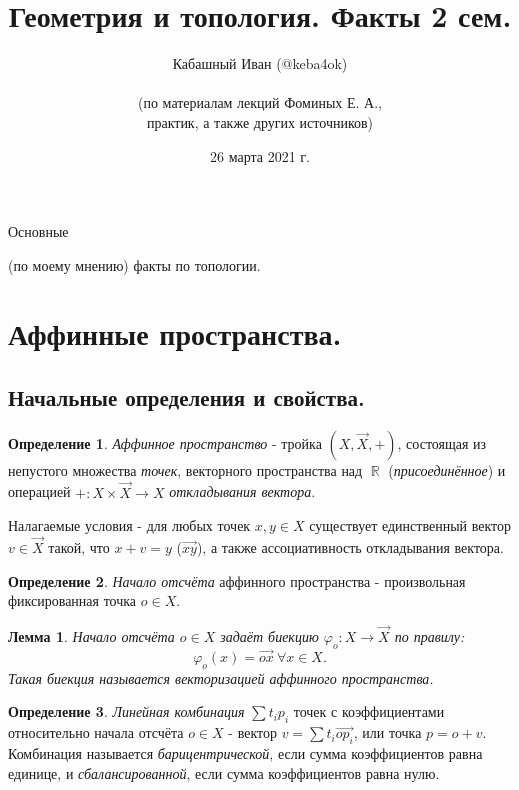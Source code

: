 \documentclass[a4paper,100pt]{article}
\title{Геометрия и топология. Факты 2 сем.}
\author{Кабашный Иван (@keba4ok)\\ \\ (по материалам лекций Фоминых Е. А.,\\ практик, а также других источников)}
\date{26 марта 2021 г.}
\theoremstyle{indented}
\newtheorem{lemma}{Лемма}
\theoremstyle{definition}
\newtheorem{defn}{Определение}
\theoremstyle{remark}
\DeclareMathOperator{\ra}{\rightarrow}
\DeclareMathOperator{\RR}{\mathbb{R}}
\begin{document}
\newcommand{\resetexlcounters}{%
  \setcounter{exl}{0}%
} 

\newcommand{\resetremarkcounters}{%
  \setcounter{remark}{0}%
} 

\newcommand{\reseconscounters}{%
  \setcounter{cons}{0}%
} 

\newcommand{\resetall}{%
    \resetexlcounters
    \resetremarkcounters
    \reseconscounters%
}

\maketitle 

\newpage

\hypertarget{t1}{Основные} (по моему мнению) факты по топологии.
\tableofcontents

\newpage


\section{Аффинные пространства.}

\subsection{Начальные определения и свойства.}

\begin{defn}
    \textit{Аффинное пространство} - тройка $(X, \vec{X}, +)$, состоящая из непустого множества \textit{точек}, векторного пространства над $\RR$ (\textit{присоединённое}) и операцией $+:X\times \vec{X}\ra X$ \textit{откладывания вектора}. \ 

    Налагаемые условия - для любых точек $x, y\in X$ существует единственный вектор $v\in \vec{X}$ такой, что $x+v=y$ ($\vec{xy}$), а также ассоциативность откладывания вектора.
\end{defn}

\begin{defn}
    \textit{Начало отсчёта} аффинного пространства - произвольная фиксированная точка $o\in X$. 
\end{defn}

\begin{lemma}
    Начало отсчёта $o\in X$ задаёт биекцию $\varphi_o: X\ra \vec{X}$ по правилу:
    \[
        \varphi_o(x)=\vec{ox} \: \forall x \in X. 
    \]
    Такая биекция называется \textit{векторизацией} аффинного пространства.
\end{lemma}

\begin{defn}
    \textit{Линейная комбинация} $\sum t_i p_i$ точек с коэффициентами относительно начала отсчёта $o\in X$ - вектор $v = \sum t_i \vec{op_i}$, или точка $p=o+v$. Комбинация называется \textit{барицентрической}, если сумма коэффициентов равна единице, и \textit{сбалансированной}, если сумма коэффициентов равна нулю.
\end{defn}
\end{document}
